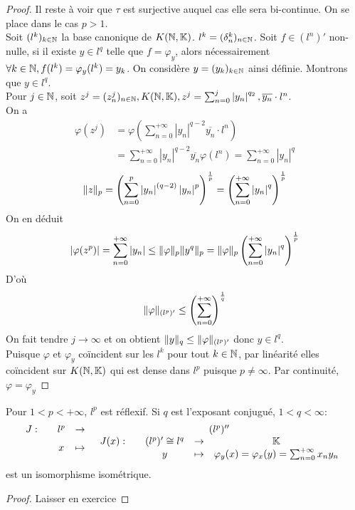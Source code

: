 \documentclass[]{report}
\begin{document}
    \begin{proof}
        Il reste à voir que $\tau$ est surjective auquel cas elle sera bi-continue. On se place dans le cas $p>1$.\\
        Soit $(l^k)_{k\in \mathbb{N}}$ la base canonique de $K(\mathbb{N},\mathbb{K})$. $l^k=(\delta_n^k)_{{n\in\mathbb{N}}}$. Soit $f\in (l^n)'$ non-nulle, si il existe $y\in l^q$ telle que $f=\varphi_y$, alors nécessairement $\forall k\in \mathbb{N}, f(l^k)=\varphi_y(l^k)=y_k$. On considère $y=(y_k)_{k\in \mathbb{N}}$ ainsi définie. Montrons que $y\in l^q$.\\
        Pour $j\in \mathbb{N}$, soit $z^{j}=(z_n^j)_{n\in\mathbb{N}}, K(\mathbb{N},\mathbb{K}), z^j=\sum_{n=0}^{j}\left| y_n\right|^{q_2}, \overline{y_n}\cdot l^n$.\\
        On a \begin{align*}
            \varphi(z^j)&=\varphi (\sum_{n=0}^{+\infty}\left|y_n\right|^{q-2}\overline{y_n}\cdot l^n)\\
            &=\sum_{n=0}^{+\infty}\left|y_n\right|^{q-2}\overline{y_n}\varphi(l^n)=\sum_{n=0}^{+\infty}\left|y_n\right|^q
        \end{align*}
        \[\lVert z \rVert_p= \left(\sum_{n=0}^{p}\left|y_n\right|^{(q-2)}\left|y_n\right|^p\right)^{\frac{1}{p}}=\left(\sum_{n=0}^{+\infty} \left|y_n\right|^q\right)^{\frac{1}{p}}\]
        On en déduit
        \[\left|\varphi(z^p)\right|=\sum_{n=0}^{+\infty}\left|y_n\right|\le \lVert \varphi \rVert_p \lVert y^{q} \rVert_p=\lVert \varphi \rVert_p\left(\sum_{n=0}^{+\infty}\left|y_n\right|^q\right)^{\frac{1}{p}}\]
        D'où
        \[\lVert \varphi \rVert_{(l^p)'}\le \left( \sum_{n=0}^{+\infty}\right)^{\frac{1}{q}}\]
        On fait tendre $j\to \infty$ et on obtient $\lVert y \rVert_q\le \lVert \varphi \rVert_{(l^p)'}$ donc $y\in l^q$.\\
        Puisque $\varphi$ et $\varphi_y$ coïncident sur les $l^k$ pour tout $k\in \mathbb{N}$, par linéarité elles coïncident sur $K(\mathbb{N},\mathbb{K})$ qui est dense dans $l^p$ puisque $p\neq \infty$. Par continuité, $\varphi=\varphi_y$
    \end{proof}

    \begin{cor}{}{}
        Pour $1<p<+\infty$, $l^p$ est réflexif. Si $q$ est l'exposant conjugué, $1<q<\infty$:
        \[\begin{array}{ccccc} J : & & l^p & \to & (l^p)'' \\ & & x & \mapsto & \begin{array}{ccccc} J(x) : & & (l^p)'\cong l^q & \to & \mathbb{K} \\ & & y & \mapsto & \varphi_y(x)=\varphi_x(y)=\sum_{n=0}^{+\infty} x_n y_n \end{array} \end{array}\]
        est un isomorphisme isométrique.
    \end{cor}

    \begin{proof}
        Laisser en exercice
    \end{proof}
\end{document}
